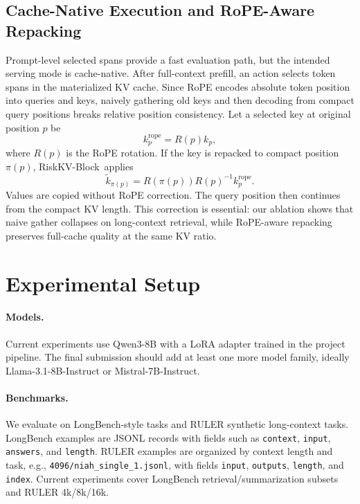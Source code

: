 \documentclass{article}
\newcommand{\method}{RiskKV-Block}
\begin{document}
\subsection{Cache-Native Execution and RoPE-Aware Repacking}

Prompt-level selected spans provide a fast evaluation path, but the intended serving mode is cache-native.
After full-context prefill, an action selects token spans in the materialized KV cache.
Since RoPE encodes absolute token position into queries and keys, naively gathering old keys and then decoding from compact query positions breaks relative position consistency.
Let a selected key at original position $p$ be
\begin{equation}
    k_p^{\mathrm{rope}} = R(p) k_p,
\end{equation}
where $R(p)$ is the RoPE rotation.
If the key is repacked to compact position $\pi(p)$, \method\ applies
\begin{equation}
    \tilde{k}_{\pi(p)}
    =
    R(\pi(p)) R(p)^{-1} k_p^{\mathrm{rope}}.
    \label{eq:rope-repack}
\end{equation}
Values are copied without RoPE correction.
The query position then continues from the compact KV length.
This correction is essential: our ablation shows that naive gather collapses on long-context retrieval, while RoPE-aware repacking preserves full-cache quality at the same KV ratio.

\section{Experimental Setup}

\paragraph{Models.}
Current experiments use Qwen3-8B with a LoRA adapter trained in the project pipeline.
The final submission should add at least one more model family, ideally Llama-3.1-8B-Instruct or Mistral-7B-Instruct.

\paragraph{Benchmarks.}
We evaluate on LongBench-style tasks and RULER synthetic long-context tasks.
LongBench examples are JSONL records with fields such as \texttt{context}, \texttt{input}, \texttt{answers}, and \texttt{length}.
RULER examples are organized by context length and task, e.g., \texttt{4096/niah\_single\_1.jsonl}, with fields \texttt{input}, \texttt{outputs}, \texttt{length}, and \texttt{index}.
Current experiments cover LongBench retrieval/summarization subsets and RULER 4k/8k/16k.
\end{document}
